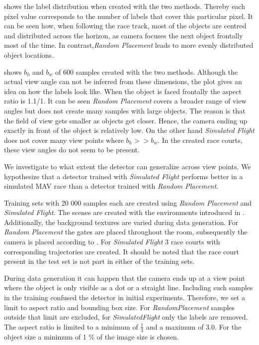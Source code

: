  shows the label distribution when created with the two methods. Thereby each pixel value corresponds to the number of labels that cover this particular pixel. It can be seen how, when following the race track, most of the objects are centred and distributed across the horizon, as camera focuses the next object frontally most of the time. In contrast,\textit{Random Placement} leads to more evenly distributed object locations. 

 shows $b_h$ and $b_w$ of 600 samples created with the two methods. Although the actual view angle can not be inferred from these dimensions, the plot gives an idea on how the labels look like. When the object is faced frontally the aspect ratio is 1.1/1. It can be seen  \textit{Random Placement} covers a broader range of view angles but does not create many samples with large objects. The reason is that the field of view gets smaller as objects get closer. Hence, the camera ending up exactly in front of the object is relatively low. On the other hand \textit{Simulated Flight} does not cover many view points where $b_h >> b_w$. In the created race courts, these view angles do not seem to be present.

We investigate to what extent the detector can generalize across view points. We hypothesize that a detector trained with \textit{Simulated Flight} performs better in a simulated \ac{MAV} race than a detector trained with \textit{Random Placement}. 

Training sets with 20 000 samples each are created using \textit{Random Placement} and \textit{Simulated Flight}. The scenes are created with the environments introduced in . Additionally, the background textures are varied during data generation. For \textit{Random Placement} the gates are placed throughout the room, subsequently the camera is placed according to . For \textit{Simulated Flight} 3 race courts with corresponding trajectories are created. It should be noted that the race court present in the test set is not part in either of the training sets. 

During data generation it can happen that the camera ends up at a view point where the object is only visible as a dot or a straight line. Including such samples in the training confused the detector in initial experiments. Therefore, we set a limit to aspect ratio and bounding box size. For \textit{RandomPlacement} samples outside that limit are excluded, for \textit{SimulatedFlight} only the labels are removed. The aspect ratio is limited to a minimum  of $\frac{1}{3}$ and a maximum of 3.0. For the object size a minimum of 1 \% of the image size is chosen.



